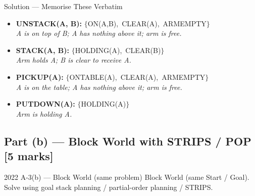 \documentclass[12pt,a4paper]{article}
\begin{document}
\begin{solbox}{Solution --- Memorise These Verbatim}
\begin{itemize}[noitemsep,leftmargin=*]
  \item \textbf{UNSTACK(A, B):} $\{$ON(A,B),\ CLEAR(A),\ ARMEMPTY$\}$\\
    \hfill\emph{A is on top of B; A has nothing above it; arm is free.}
  \item \textbf{STACK(A, B):} $\{$HOLDING(A),\ CLEAR(B)$\}$\\
    \hfill\emph{Arm holds A; B is clear to receive A.}
  \item \textbf{PICKUP(A):} $\{$ONTABLE(A),\ CLEAR(A),\ ARMEMPTY$\}$\\
    \hfill\emph{A is on the table; A has nothing above it; arm is free.}
  \item \textbf{PUTDOWN(A):} $\{$HOLDING(A)$\}$\\
    \hfill\emph{Arm is holding A.}
\end{itemize}
\end{solbox}

\subsection{Part (b) --- Block World with STRIPS / POP [5 marks]}

\begin{qbox}{2022 A-3(b) --- Block World (same problem)}
Block World (same Start / Goal).
Solve using goal stack planning / partial-order planning / STRIPS.
\end{qbox}
\end{document}
